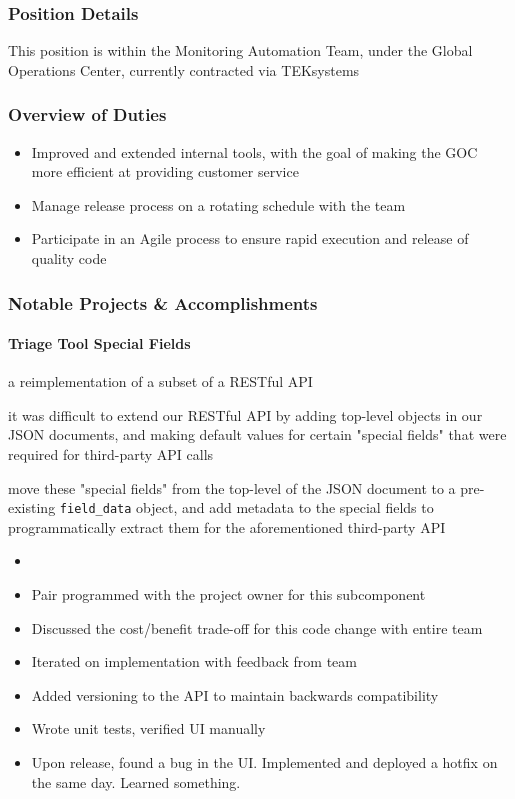 \documentclass[11pt]{article}
\begin{document}
\subsubsection*{Position Details}
This position is within the Monitoring Automation Team, under the Global Operations Center, currently contracted via TEKsystems

\subsubsection*{Overview of Duties}
\begin{itemize}[noitemsep,leftmargin=1em]
	\item Improved and extended internal tools, with the goal of making the GOC more efficient at providing customer service
	\item Manage release process on a rotating schedule with the team
	\item Participate in an Agile process to ensure rapid execution and release of quality code
\end{itemize}

\subsubsection*{Notable Projects \& Accomplishments}
\paragraph{Triage Tool Special Fields} a reimplementation of a subset of a RESTful API
\begin{description}[noitemsep,leftmargin=1em]
	\item [Problem] it was difficult to extend our RESTful API by adding top-level objects in our JSON documents, and making default values for certain "special fields" that were required for third-party API calls
	\item [Solution] move these "special fields" from the top-level of the JSON document to a pre-existing \verb+field_data+ object, and add metadata to the special fields to programmatically extract them for the aforementioned third-party API
	\item [Process] \begin{itemize}[noitemsep,leftmargin=0em]
		\item[] %
		\item Pair programmed with the project owner for this subcomponent
		\item Discussed the cost/benefit trade-off for this code change with entire team
		\item Iterated on implementation with feedback from team
		\item Added versioning to the API to maintain backwards compatibility
		\item Wrote unit tests, verified UI manually
		\item Upon release, found a bug in the UI. Implemented and deployed a hotfix on the same day. Learned something.
	\end{itemize}
\end{description}
\end{document}
